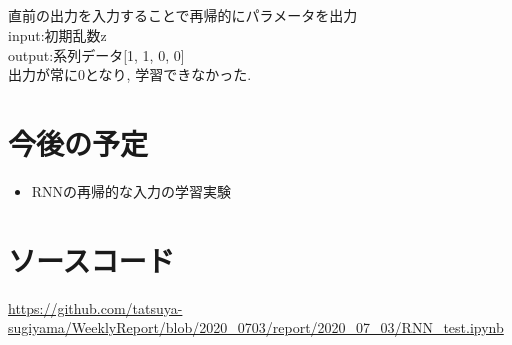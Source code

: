 \documentclass[twocolumn]{jarticle}     %
\begin{document}
\subsection{}
直前の出力を入力することで再帰的にパラメータを出力\\
input:初期乱数z\\
output:系列データ[1, 1, 0, 0]\\
出力が常に0となり, 学習できなかった.

\section{今後の予定}
\begin{itemize}
	\item {RNNの再帰的な入力の学習実験}
\end{itemize}


\section{ソースコード}
\url{https://github.com/tatsuya-sugiyama/WeeklyReport/blob/2020_0703/report/2020_07_03/RNN_test.ipynb}




\end{document}
